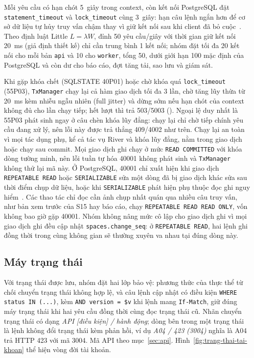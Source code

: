 Mỗi yêu cầu có hạn chót 5~giây trong context, còn kết nối PostgreSQL đặt \texttt{statement\_timeout} và \texttt{lock\_timeout} cùng 3~giây: hạn câu lệnh ngắn hơn để cơ sở dữ liệu tự hủy truy vấn chậm thay vì giữ kết nối sau khi client đã bỏ cuộc~\cite{nygard}. Theo định luật Little $L = \lambda W$, đỉnh 50 yêu cầu/giây với thời gian giữ kết nối 20~ms (giả định thiết kế) chỉ cần trung bình 1 kết nối; nhóm đặt tối đa 20 kết nối cho mỗi bản \texttt{api} và 10 cho \texttt{worker}, tổng 50, dưới giới hạn 100 mặc định của PostgreSQL và còn dư cho báo cáo, đợt tăng tải, sao lưu và giám sát.

Khi gặp khóa chết (SQLSTATE 40P01) hoặc chờ khóa quá \texttt{lock\_timeout} (55P03), \texttt{TxManager} chạy lại cả hàm giao dịch tối đa 3 lần, chờ tăng lũy thừa từ 20~ms kèm nhiễu ngẫu nhiên (full jitter) và dừng sớm nếu hạn chót của context không đủ cho lần chạy tiếp; hết lượt thì trả 503/5003 (). Ngoại lệ duy nhất là 55P03 phát sinh ngay ở câu chèn khóa lũy đẳng: chạy lại chỉ chờ tiếp chính yêu cầu đang xử lý, nên lỗi này được trả thẳng 409/4002 như trên. Chạy lại an toàn vì mọi tác dụng phụ, kể cả tác vụ River và khóa lũy đẳng, nằm trong giao dịch hoặc chạy sau commit. Mọi giao dịch ghi chạy ở mức \texttt{READ COMMITTED} với khóa dòng tường minh, nên lỗi tuần tự hóa 40001 không phát sinh và \texttt{TxManager} không thử lại mã này. Ở PostgreSQL, 40001 chỉ xuất hiện khi giao dịch \texttt{REPEATABLE READ} hoặc \texttt{SERIALIZABLE} sửa một dòng đã bị giao dịch khác sửa sau thời điểm chụp dữ liệu, hoặc khi \texttt{SERIALIZABLE} phát hiện phụ thuộc đọc ghi nguy hiểm~\cite{postgresql}. Các thao tác chỉ đọc cần ảnh chụp nhất quán qua nhiều câu truy vấn, như bản xem trước của S15 hay báo cáo, chạy \texttt{REPEATABLE READ READ ONLY}, vốn không bao giờ gặp 40001. Nhóm không nâng mức cô lập cho giao dịch ghi vì mọi giao dịch ghi đều cập nhật \texttt{spaces.change\_seq}: ở \texttt{REPEATABLE READ}, hai lệnh ghi đồng thời trong cùng không gian sẽ thường xuyên va nhau tại đúng dòng này.

\subsection{Máy trạng thái}\label{ssec:may-trang-thai}

Với trạng thái được lưu, nhóm đặt hai lớp bảo vệ: phương thức của thực thể từ chối chuyển trạng thái không hợp lệ, và câu lệnh cập nhật có điều kiện \texttt{WHERE status IN (...)}, kèm \texttt{AND version = \$v} khi lệnh mang \texttt{If-Match}, giữ đúng máy trạng thái khi hai yêu cầu đồng thời cùng đọc trạng thái cũ. Nhãn chuyển trạng thái có dạng \textit{API [điều kiện] / hành động}; dòng bên trong một trạng thái là lệnh không đổi trạng thái kèm phản hồi, ví dụ \textit{A04 / 423 (3004)} nghĩa là A04 trả HTTP 423 với mã 3004. Mã API theo mục~\ref{sec:api}. Hình~\ref{fig:trang-thai-tai-khoan} thể hiện vòng đời tài khoản.

